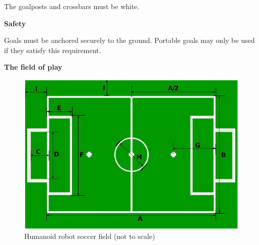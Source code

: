 \bigskip

The goalposts and crossbars must be white.

\bigskip

{\bfseries Safety}

\headlinebox

Goals must be anchored securely to the ground. Portable goals may only be used if they satisfy this requirement.

\bigskip

{\bfseries The field of play}

\headlinebox 

\begin{center}
\begin{figure}[h]
\includegraphics[width=\textwidth]{img/field.png}
\caption{Humanoid robot soccer field (not to scale)}
\end{figure}
\end{center}
\newpage


